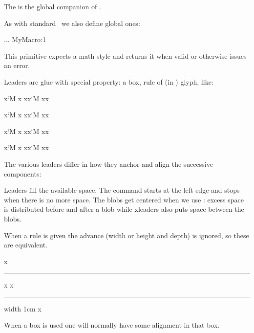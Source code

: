 {\getbuffer}

\stopoldprimitive

\startoldprimitive[title={\prm {gdef}}]

The is the global companion of .

\stopoldprimitive

\startnewprimitive[title={\prm {gdefcsname}}]

As with standard \TEX\ we also define global ones:

\starttyping
\expandafter\gdef\csname MyMacro:1\endcsname{...}
             \gdefcsname MyMacro:1
\stoptyping

\stopnewprimitive

\startnewprimitive[title={\prm {givenmathstyle}}]

This primitive expects a math style and returns it when valid or otherwise issues
an error.

\stopnewprimitive

\startnewprimitive[title={\prm {gleaders}}]

Leaders are glue with special property: a box, rule of (in \LUAMETATEX) glyph, like:

\startbuffer
x\leaders   \glyph `M \hfill  x
xx\leaders  \glyph `M \hfill xx

x\cleaders  \glyph `M \hfill x
xx\cleaders \glyph `M \hfill xx

x\xleaders  \glyph `M \hfill x
xx\xleaders \glyph `M \hfill xx

x\gleaders  \glyph `M \hfill x
xx\gleaders \glyph `M \hfill xx
\stopbuffer

\typebuffer

The various leaders differ in how they anchor and align the successive
components:

\startlines
\getbuffer
\stoplines

Leaders fill the available space. The  command starts at the left
edge and stops when there is no more space. The blobs get centered when we use
: excess space is distributed before and after a blob while \prm
{xleaders} also puts space between the blobs.

When a rule is given the advance (width or height and depth) is ignored, so these
are equivalent.

\starttyping
x\leaders \hrule           \hfill x
x\leaders \hrule width 1cm \hfill x
\stoptyping

When a box is used one will normally have some alignment in that box.

